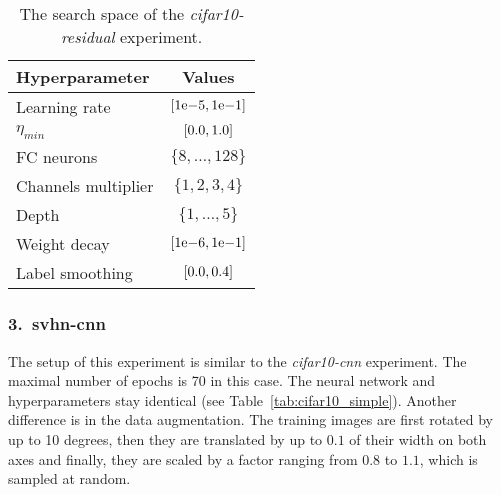 \begin{table}
    \centering
    \begin{tabular}{lc}
        \toprule
        Hyperparameter & Values \\
        \midrule
        Learning rate & $\interval{1\mathrm{e}{-5}}{1\mathrm{e}{-1}}$ \\
        $\eta_{min}$ & $\interval{0.0}{1.0}$ \\
        FC neurons & $\{8,\ldots , 128\}$ \\
        Channels multiplier & $\{1, 2, 3 , 4\}$ \\
        Depth & $\{1, \ldots , 5\}$ \\
        Weight decay & $\interval{1\mathrm{e}{-6}}{1\mathrm{e}{-1}}$ \\
        Label smoothing & $\interval{0.0}{0.4}$ \\
        \bottomrule
    \end{tabular}
    \caption{The search space of the \textit{cifar10-residual} experiment.}
    \label{tab:cifar10_residual}
\end{table}


\subsubsection{3.\ svhn-cnn}
The setup of this experiment is similar to the \textit{cifar10-cnn} experiment. The maximal number of epochs is 70 in this case. The neural network and hyperparameters stay identical (see Table~{\ref{tab:cifar10_simple}}). Another difference is in the data augmentation. The training images are first rotated by up to 10 degrees, then they are translated by up to $0.1$ of their width on both axes and finally, they are scaled by a factor ranging from $0.8$ to $1.1$, which is sampled at random.


